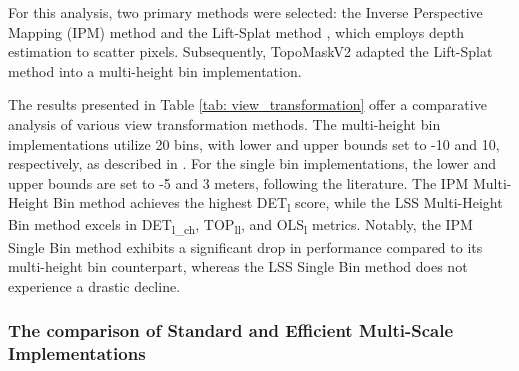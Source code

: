 \begin{table}[t]
\centering
\caption{Performance Comparison of View Transformation Methods from PV to BEV.}
\label{tab: view_transformation}
\end{table}

For this analysis, two primary methods were selected: the Inverse Perspective Mapping (IPM) method \cite{xie2022m, li2024fast, harley2023simple} and the Lift-Splat method \cite{huang2021bevdet, philion2020lift, li2023bevdepth}, which employs depth estimation to scatter pixels. Subsequently, TopoMaskV2 \cite{kalfaoglu2024topomaskv2} adapted the Lift-Splat method into a multi-height bin implementation.

The results presented in Table \ref{tab: view_transformation} offer a comparative analysis of various view transformation methods. The multi-height bin implementations utilize 20 bins, with lower and upper bounds set to -10 and 10, respectively, as described in \cite{kalfaoglu2024topomaskv2}. For the single bin implementations, the lower and upper bounds are set to -5 and 3 meters, following the literature. The IPM Multi-Height Bin method achieves the highest DET\textsubscript{l} score, while the LSS Multi-Height Bin method excels in DET\textsubscript{l\_ch}, TOP\textsubscript{ll}, and OLS\textsubscript{l} metrics. Notably, the IPM Single Bin method exhibits a significant drop in performance compared to its multi-height bin counterpart, whereas the LSS Single Bin method does not experience a drastic decline.

\subsubsection{The comparison of Standard and Efficient Multi-Scale Implementations}
\label{sup: compare_ms_implementations}

